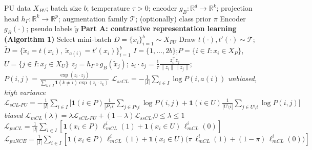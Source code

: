 \documentclass{article}
\begin{document}
\begin{algorithm}[!h]
\renewcommand{\algorithmicrequire}{\textbf{Input:}} %
\renewcommand{\algorithmicensure}{\textbf{Output:}} %
	\caption{puCL / puNCE contrastive pretraining, and puPL pseudo labeling} %
	\begin{algorithmic}[1] %
	    \REQUIRE
	    PU data $X_{PU}$; batch size $b$; temperature $\tau>0$;
	    encoder $g_{B}:\mathbb{R}^{d}\to\mathbb{R}^{k}$; projection head $h_{\Gamma}:\mathbb{R}^{k}\to\mathbb{R}^{p}$;
	    augmentation family $\mathcal{T}$; (optionally) class prior $\pi$
	    \ENSURE
	    Encoder $g_{B}(\cdot)$; pseudo labels $\tilde{y}$
	    \STATE \textbf{Part A: contrastive representation learning (Algorithm 1)}
	    \STATE Select mini-batch $D=\{x_{i}\}_{i=1}^{b}\sim X_{PU}$
	    \STATE Draw $t(\cdot),t'(\cdot)\sim\mathcal{T}$;\quad
	    $\tilde{D}=\{\tilde{x}_{i}=t(x_{i}),\ \tilde{x}_{a(i)}=t'(x_{i})\}_{i=1}^{b}$ %
	    \STATE $I=\{1,\dots,2b\}$;\quad $P=\{i\in I:x_{i}\in X_{P}\}$,\quad $U=\{j\in I:x_{j}\in X_{U}\}$
	    \STATE $z_{j}=h_{\Gamma}\circ g_{B}(\tilde{x}_{j})$;\quad
	    $z_{i}\cdot z_{j}=\frac{1}{\tau}\frac{z_{i}^{\top}z_{j}}{\|z_{i}\|\|z_{j}\|}$;\quad
	    $P(i,j)=\frac{\exp(z_{i}\cdot z_{j})}{\sum_{k\in I}\mathbf{1}(k\neq i)\exp(z_{i}\cdot z_{k})}$
	    \STATE $\mathcal{L}_{ssCL}=-\frac{1}{|I|}\sum_{i\in I}\log P(i,a(i))$
	    \hfill \emph{unbiased, high variance} %
	    \STATE $\mathcal{L}_{sCL\text{-}PU}=-\frac{1}{|I|}\sum_{i\in I}\Big[\mathbf{1}(i\in P)\frac{1}{|P\setminus i|}\sum_{j\in P\setminus i}\log P(i,j)
	    +\mathbf{1}(i\in U)\frac{1}{|U\setminus i|}\sum_{j\in U\setminus i}\log P(i,j)\Big]$
	    \hfill \emph{biased} %
	    \STATE $\mathcal{L}_{mCL}(\lambda)=\lambda\mathcal{L}_{sCL\text{-}PU}+(1-\lambda)\mathcal{L}_{ssCL}$,\quad $0\leq\lambda\leq 1$
	    \STATE $\mathcal{L}_{puCL}=\frac{1}{|I|}\sum_{i\in I}\left[\mathbf{1}(x_{i}\in P)\,\ell_{mCL}^{i}(1)+\mathbf{1}(x_{i}\in U)\,\ell_{mCL}^{i}(0)\right]$ %
	    \STATE $\mathcal{L}_{puNCE}=\frac{1}{|I|}\sum_{i\in I}\left[\mathbf{1}(x_{i}\in P)\,\ell_{mCL}^{i}(1)
	    +\mathbf{1}(x_{i}\in U)\big(\pi\,\ell_{mCL}^{i}(1)+(1-\pi)\,\ell_{mCL}^{i}(0)\big)\right]$ %

\end{algorithmic}
\end{algorithm}
\end{document}
